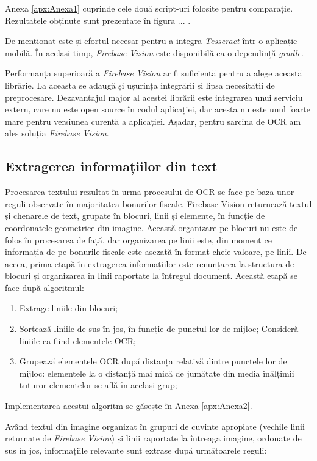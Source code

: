 Anexa \ref{apx:Anexa1} cuprinde cele două script-uri folosite pentru comparație. Rezultatele obținute sunt prezentate în figura ... .

De menționat este și efortul necesar pentru a integra \emph{Tesseract} într-o aplicație mobilă. În același timp, \emph{Firebase Vision} este disponibilă ca o dependință \emph{gradle}.

Performanța superioară a \emph{Firebase Vision} ar fi suficientă pentru a alege această librărie. La aceasta se adaugă și ușurința integrării și lipsa necesității de preprocesare. Dezavantajul major al acestei librării este integrarea unui serviciu extern, care nu este open source în codul aplicației, dar acesta nu este unul foarte mare pentru versiunea curentă a aplicației. Așadar, pentru sarcina de OCR am ales soluția \emph{Firebase Vision}.

\subsection{Extragerea informațiilor din text}

Procesarea textului rezultat în urma procesului de OCR se face pe baza unor reguli observate în majoritatea bonurilor fiscale. Firebase Vision returnează textul și chenarele de text, grupate în blocuri, linii și elemente, în funcție de coordonatele geometrice din imagine. Această organizare pe blocuri nu este de folos în procesarea de față, dar organizarea pe linii este, din moment ce informația de pe bonurile fiscale este așezată în format cheie-valoare, pe linii. De aceea, prima etapă în extragerea informațiilor este renunțarea la structura de blocuri și organizarea în linii raportate la întregul document. Această etapă se face după algoritmul:

\begin{enumerate}
  \item
  Extrage liniile din blocuri;
  \item
  Sortează liniile de sus în jos, în funcție de punctul lor de mijloc; Consideră liniile ca fiind elementele OCR;
  \item
  Grupează elementele OCR după distanța relativă dintre punctele lor de mijloc: elementele la o distanță mai mică de jumătate din media înălțimii tuturor elementelor se află în același grup;
\end{enumerate}

Implementarea acestui algoritm se găsește în Anexa \ref{apx:Anexa2}.

Având textul din imagine organizat în grupuri de cuvinte apropiate (vechile linii returnate de \emph{Firebase Vision}) și linii raportate la întreaga imagine, ordonate de sus în jos, informațiile relevante sunt extrase după următoarele reguli:

